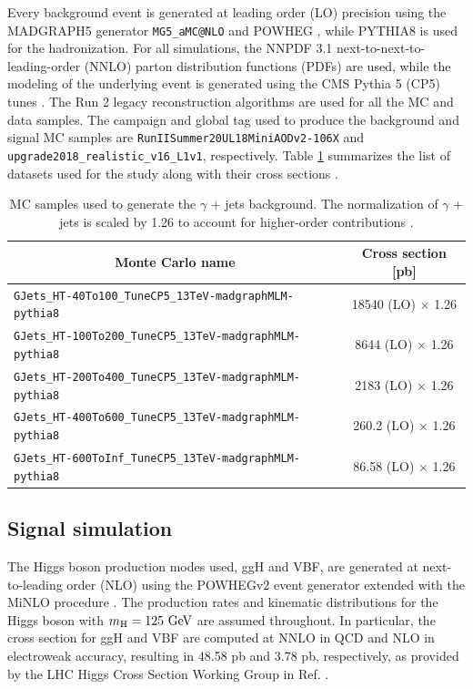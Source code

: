 Every background event is generated at leading order (LO) precision using the MADGRAPH5 generator \verb+MG5_aMC@NLO+ \cite{Alwall:2014hca} and POWHEG \cite{Alioli:2010xd}, while PYTHIA8 \cite{Sjostrand:2014zea} is used for the hadronization. For all simulations, the NNPDF 3.1 \cite{NNPDF:2017mvq} next-to-next-to-leading-order (NNLO) parton distribution functions (PDFs) are used, while the modeling of the underlying event is generated using the CMS Pythia 5 (CP5) tunes \cite{CMS:2019csb}. The Run 2 legacy reconstruction algorithms \cite{Elmetenawee:2020emw} are used for all the MC and data samples. The campaign and global tag used to produce the background and signal MC samples are \verb+RunIISummer20UL18MiniAODv2-106X+ and \verb+upgrade2018_realistic_v16_L1v1+, respectively. Table \ref{tab:MC_samples} summarizes the list of datasets used for the study along with their cross sections \cite{CERN:xsdb}.

\begin{table}[ht]
    \centering
    \begin{tabular}{|l|c|}
        \hline
        \multicolumn{1}{|c|}{\cellcolor{lightgray}Monte Carlo name} & \cellcolor{lightgray}Cross section [pb] \\ \hline
        \verb+GJets_HT-40To100_TuneCP5_13TeV-madgraphMLM-pythia8+  & 18540 (LO) $\times$ 1.26 \\
        \verb+GJets_HT-100To200_TuneCP5_13TeV-madgraphMLM-pythia8+  & 8644 (LO) $\times$ 1.26 \\
        \verb+GJets_HT-200To400_TuneCP5_13TeV-madgraphMLM-pythia8+  & 2183 (LO) $\times$ 1.26 \\
        \verb+GJets_HT-400To600_TuneCP5_13TeV-madgraphMLM-pythia8+  & 260.2 (LO) $\times$ 1.26 \\
        \verb+GJets_HT-600ToInf_TuneCP5_13TeV-madgraphMLM-pythia8+  & 86.58 (LO) $\times$ 1.26 \\ \hline
    \end{tabular}
    \caption{MC samples used to generate the $\gamma$ + jets background. The normalization of $\gamma$ + jets is scaled by 1.26 to account for higher-order contributions \cite{CMS:2018qao}.}
    \label{tab:MC_samples}
\end{table}

\subsection{Signal simulation}

The Higgs boson production modes used, ggH and VBF, are generated at next-to-leading order (NLO) using the POWHEGv2 event generator extended with the MiNLO procedure \cite{Hamilton:2012np}. The production rates and kinematic distributions for the Higgs boson with $m_\text{H}=125\ \text{GeV}$ are assumed throughout. In particular, the cross section for ggH and VBF are computed at NNLO in QCD and NLO in electroweak accuracy, resulting in 48.58 pb and 3.78 pb, respectively, as provided by the LHC Higgs Cross Section Working Group in Ref. \cite{LHCHiggsCrossSectionWorkingGroup:2016ypw}.

